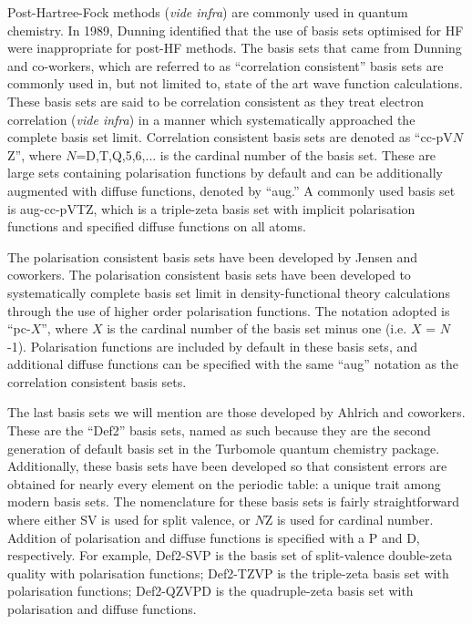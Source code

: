 \vspace{3mm}
\vspace{1mm}

Post-Hartree-Fock methods (\emph{vide infra}) are commonly used in quantum chemistry. In 1989, Dunning\cite{Dunning1989} identified that the use of basis sets optimised for HF were inappropriate for post-HF methods. The basis sets that came from Dunning and co-workers, which are referred to as ``correlation consistent'' basis sets are commonly used in, but not limited to, state of the art wave function calculations. These basis sets are said to be correlation consistent as they treat electron correlation (\emph{vide infra}) in a manner which systematically approached the complete basis set limit. Correlation consistent basis sets are denoted as ``cc-pV$N$Z'', where $N$=D,T,Q,5,6,... is the cardinal number of the basis set. These are large sets containing polarisation functions by default and can be additionally augmented with diffuse functions, denoted by ``aug.'' A commonly used basis set is aug-cc-pVTZ, which is a triple-zeta basis set with implicit polarisation functions and specified diffuse functions on all atoms.

\vspace{3mm}
\vspace{1mm}

The polarisation consistent basis sets have been developed by Jensen and coworkers.\cite{Jensen2001} The polarisation consistent basis sets have been developed to systematically complete basis set limit in density-functional theory calculations through the use of higher order polarisation functions. The notation adopted is ``pc-$X$'', where $X$ is the cardinal number of the basis set minus one (i.e. $X$ = $N$-1). Polarisation functions are included by default in these basis sets, and additional diffuse functions can be specified with the same ``aug'' notation as the correlation consistent basis sets.

\vspace{3mm}
\vspace{1mm}

The last basis sets we will mention are those developed by Ahlrich and coworkers.\cite{Schafer1992,Weigend2005} These are the ``Def2'' basis sets, named as such because they are the second generation of default basis set in the Turbomole quantum chemistry package.\cite{turbomole} Additionally, these basis sets have been developed so that consistent errors are obtained for nearly every element on the periodic table: a unique trait among modern basis sets. The nomenclature for these basis sets is fairly straightforward where either SV is used for split valence, or $N$Z is used for cardinal number. Addition of polarisation and diffuse functions is specified with a P and D, respectively. For example, Def2-SVP is the basis set of split-valence double-zeta quality with polarisation functions; Def2-TZVP is the triple-zeta basis set with polarisation functions; Def2-QZVPD is the quadruple-zeta basis set with polarisation and diffuse functions.

